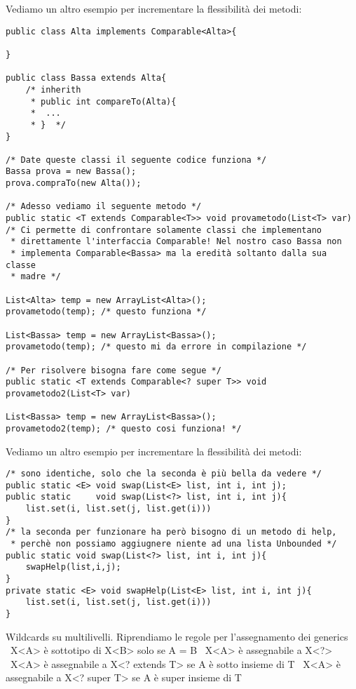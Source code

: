 \noindent Vediamo un altro esempio per incrementare la flessibilità dei metodi:
\begin{lstlisting}
public class Alta implements Comparable<Alta>{

}

public class Bassa extends Alta{
	/* inherith
	 * public int compareTo(Alta){
	 *	...
	 * }  */
}

/* Date queste classi il seguente codice funziona */
Bassa prova = new Bassa();
prova.compraTo(new Alta());

/* Adesso vediamo il seguente metodo */
public static <T extends Comparable<T>> void provametodo(List<T> var)
/* Ci permette di confrontare solamente classi che implementano
 * direttamente l'interfaccia Comparable! Nel nostro caso Bassa non
 * implementa Comparable<Bassa> ma la eredità soltanto dalla sua classe 
 * madre */

List<Alta> temp = new ArrayList<Alta>();
provametodo(temp); /* questo funziona */

List<Bassa> temp = new ArrayList<Bassa>();
provametodo(temp); /* questo mi da errore in compilazione */

/* Per risolvere bisogna fare come segue */ 
public static <T extends Comparable<? super T>> void provametodo2(List<T> var)

List<Bassa> temp = new ArrayList<Bassa>();
provametodo2(temp); /* questo cosi funziona! */
\end{lstlisting}




\noindent Vediamo un altro esempio per incrementare la flessibilità dei metodi:
\begin{lstlisting}
/* sono identiche, solo che la seconda è più bella da vedere */
public static <E> void swap(List<E> list, int i, int j);
public static     void swap(List<?> list, int i, int j){
	list.set(i, list.set(j, list.get(i)))
}
/* la seconda per funzionare ha però bisogno di un metodo di help,
 * perchè non possiamo aggiugnere niente ad una lista Unbounded */
public static void swap(List<?> list, int i, int j){
	swapHelp(list,i,j);
}
private static <E> void swapHelp(List<E> list, int i, int j){
	list.set(i, list.set(j, list.get(i)))
}
\end{lstlisting}

\noindent Wildcards su multilivelli. Riprendiamo le regole per l'assegnamento dei generics \newline
\textbullet\ X<A> è sottotipo di X<B> solo se A = B \newline
\textbullet\ X<A> è assegnabile a X<?> \newline
\textbullet\ X<A> è assegnabile a X<? extends T> se A è sotto insieme di T \newline
\textbullet\ X<A> è assegnabile a X<? super T> se A è super insieme di T \newline

